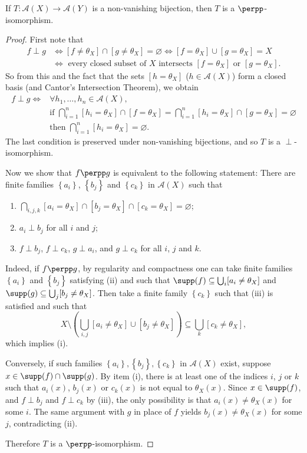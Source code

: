 \begin{proposition}\label{propositionnonvanishingbijectionisperppisomorphism}
If $T:\mathcal{A}(X)\to\mathcal{A}(Y)$ is a non-vanishing bijection, then $T$ is a $\perpp$-isomorphism.
\end{proposition}
\begin{proof}
First note that
\begin{align*}
f\perp g&\iff[f\neq\theta_X]\cap[g\neq\theta_X]=\varnothing\iff[f=\theta_X]\cup[g=\theta_X]=X\\
&\iff\text{ every closed subset of }X\text{ intersects }[f=\theta_X]\text{ or }[g=\theta_X].
\end{align*}
So from this and the fact that the sets $[h=\theta_X]$ ($h\in\mathcal{A}(X)$) form a closed basis (and Cantor's Intersection Theorem), we obtain
\begin{align*}
f\perp g\iff&\forall h_1,\ldots,h_n\in\mathcal{A}(X),\\
&\text{if }\bigcap_{i=1}^n[h_i=\theta_X]\cap[f=\theta_X]=\bigcap_{i=1}^n[h_i=\theta_X]\cap[g=\theta_X]=\varnothing\\
&\text{then }\bigcap_{i=1}^n[h_i=\theta_X]=\varnothing.
\end{align*}
The last condition is preserved under non-vanishing bijections, and so $T$ is a $\perp$-isomorphism.

Now we show that $f\perpp g$ is equivalent to the following statement: There are finite families $\left\{a_i\right\}$, $\left\{b_j\right\}$ and $\left\{c_k\right\}$ in $\mathcal{A}(X)$ such that
\begin{enumerate}
\item[(i)] $\bigcap_{i,j,k}[a_i=\theta_X]\cap[b_j=\theta_X]\cap[c_k=\theta_X]=\varnothing$;
\item[(ii)] $a_i\perp b_j$ for all $i$ and $j$;
\item[(iii)] $f\perp b_j$, $f\perp c_k$, $g\perp a_i$, and $g\perp c_k$ for all $i$, $j$ and $k$.
\end{enumerate}
Indeed, if $f\perpp g$, by regularity and compactness one can take finite families $\left\{a_i\right\}$ and $\left\{b_j\right\}$ satisfying (ii) and such that $\supp(f)\subseteq\bigcup_i[a_i\neq\theta_X]$ and $\supp(g)\subseteq\bigcup_j[b_j\neq\theta_X]$. Then take a finite family $\left\{c_k\right\}$ such that (iii) is satisfied and such that
\[X\setminus\left(\bigcup_{i,j}[a_i\neq\theta_X]\cup[b_j\neq\theta_X]\right)\subseteq\bigcup_k[c_k\neq\theta_X],\]
which implies (i).

Conversely, if such families $\left\{a_i\right\},\left\{b_j\right\},\left\{c_k\right\}$ in $\mathcal{A}(X)$ exist, suppose $x\in\supp(f)\cap\supp(g)$. By item (i), there is at least one of the indices $i$, $j$ or $k$ such that $a_i(x)$, $b_j(x)$ or $c_k(x)$ is not equal to $\theta_X(x)$. Since $x\in\supp(f)$, and $f\perp b_j$ and $f\perp c_k$ by (iii), the only possibility is that $a_i(x)\neq\theta_X(x)$ for some $i$. The same argument with $g$ in place of $f$ yields $b_j(x)\neq\theta_X(x)$ for some $j$, contradicting (ii).

Therefore $T$ is a $\perpp$-isomorphism.\qedhere
\end{proof}

